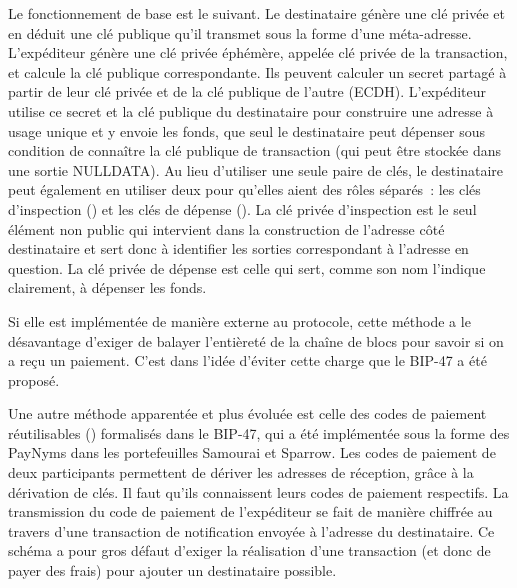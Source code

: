 Le fonctionnement de base est le suivant. Le destinataire génère une clé privée et en déduit une clé publique qu'il transmet sous la forme d'une méta-adresse. L'expéditeur génère une clé privée éphémère, appelée clé privée de la transaction, et calcule la clé publique correspondante. Ils peuvent calculer un secret partagé à partir de leur clé privée et de la clé publique de l'autre (ECDH). L'expéditeur utilise ce secret et la clé publique du destinataire pour construire une adresse à usage unique et y envoie les fonds, que seul le destinataire peut dépenser sous condition de connaître la clé publique de transaction (qui peut être stockée dans une sortie NULLDATA). Au lieu d'utiliser une seule paire de clés, le destinataire peut également en utiliser deux pour qu'elles aient des rôles séparés~: les clés d'inspection () et les clés de dépense (). La clé privée d'inspection est le seul élément non public qui intervient dans la construction de l'adresse côté destinataire et sert donc à identifier les sorties correspondant à l'adresse en question. La clé privée de dépense est celle qui sert, comme son nom l'indique clairement, à dépenser les fonds.

Si elle est implémentée de manière externe au protocole, cette méthode a le désavantage d'exiger de balayer l'entièreté de la chaîne de blocs pour savoir si on a reçu un paiement. C'est dans l'idée d'éviter cette charge que le BIP-47 a été proposé.


Une autre méthode apparentée et plus évoluée est celle des codes de paiement réutilisables () formalisés dans le BIP-47, qui a été implémentée sous la forme des PayNyms dans les portefeuilles Samourai et Sparrow. Les codes de paiement de deux participants permettent de dériver les adresses de réception, grâce à la dérivation de clés. Il faut qu'ils connaissent leurs codes de paiement respectifs. La transmission du code de paiement de l'expéditeur se fait de manière chiffrée au travers d'une transaction de notification envoyée à l'adresse du destinataire. Ce schéma a pour gros défaut d'exiger la réalisation d'une transaction (et donc de payer des frais) pour ajouter un destinataire possible.

